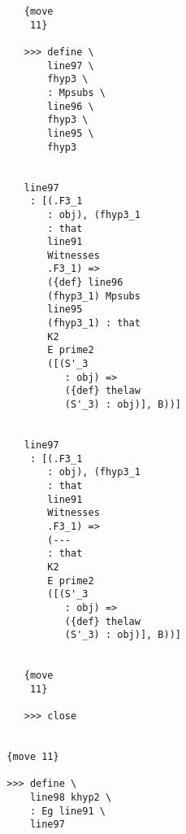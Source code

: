 \documentclass[12pt]{article}
\begin{document}
\begin{verbatim}
                                    {move 
                                     11}

                                    >>> define \
                                        line97 \
                                        fhyp3 \
                                        : Mpsubs \
                                        line96 \
                                        fhyp3 \
                                        line95 \
                                        fhyp3


                                    line97 
                                     : [(.F3_1 
                                        : obj), (fhyp3_1 
                                        : that 
                                        line91 
                                        Witnesses 
                                        .F3_1) => 
                                        ({def} line96 
                                        (fhyp3_1) Mpsubs 
                                        line95 
                                        (fhyp3_1) : that 
                                        K2 
                                        E prime2 
                                        ([(S'_3 
                                           : obj) => 
                                           ({def} thelaw 
                                           (S'_3) : obj)], B))]


                                    line97 
                                     : [(.F3_1 
                                        : obj), (fhyp3_1 
                                        : that 
                                        line91 
                                        Witnesses 
                                        .F3_1) => 
                                        (--- 
                                        : that 
                                        K2 
                                        E prime2 
                                        ([(S'_3 
                                           : obj) => 
                                           ({def} thelaw 
                                           (S'_3) : obj)], B))]


                                    {move 
                                     11}

                                    >>> close


                                 {move 11}

                                 >>> define \
                                     line98 khyp2 \
                                     : Eg line91 \
                                     line97



\end{verbatim}
\end{document}
